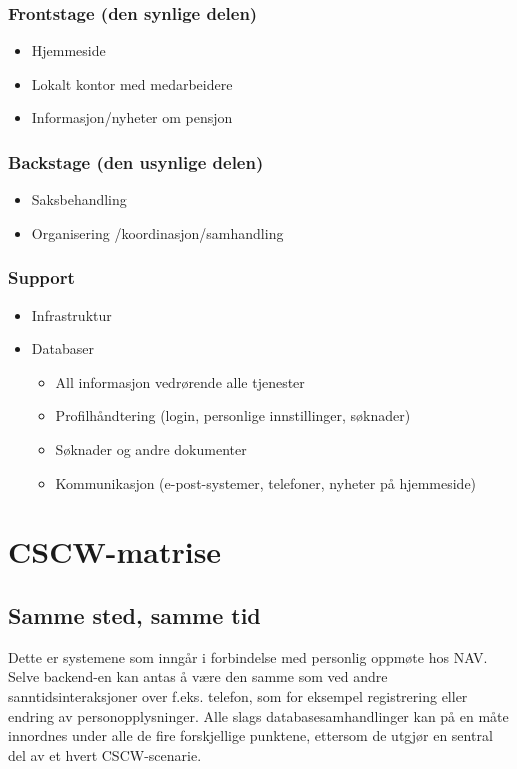 \documentclass[informationsecurity]{gucmasterproject}
\begin{document}
\subsubsection{Frontstage (den synlige delen)}
\begin{itemize}
\item Hjemmeside
\item Lokalt kontor med medarbeidere
\item Informasjon/nyheter om pensjon
\end{itemize}

\subsubsection{Backstage (den usynlige delen)}
\begin{itemize}
\item Saksbehandling
\item Organisering /koordinasjon/samhandling
\end{itemize}

\subsubsection{Support}
\begin{itemize}
\item Infrastruktur
\item Databaser
	\begin{itemize}
	\item All informasjon vedrørende alle tjenester
	\item Profilhåndtering (login, personlige innstillinger, søknader)
	\item Søknader og andre dokumenter
	\item Kommunikasjon (e-post-systemer, telefoner, nyheter på hjemmeside)
	\end{itemize}
\end{itemize}


\section{CSCW-matrise}
\subsection{Samme sted, samme tid}
Dette er systemene som inngår i forbindelse med personlig oppmøte hos NAV. Selve backend-en kan antas å være den samme som ved andre sanntidsinteraksjoner over f.eks. telefon, som for eksempel registrering eller endring av personopplysninger. Alle slags databasesamhandlinger kan på en måte innordnes under alle de fire forskjellige punktene, ettersom de utgjør en sentral del av et hvert CSCW-scenarie.
\end{document}
